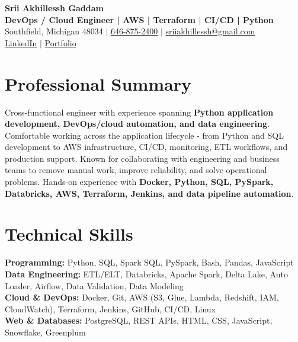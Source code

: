 \documentclass[letterpaper,10pt]{article}
\begin{document}
\fontsize{9.35pt}{10.45pt}\selectfont

\begin{center}
    {\LARGE \textbf{Srii Akhillessh Gaddam}} \\[-1pt]
    \textbf{DevOps / Cloud Engineer | AWS | Terraform | CI/CD | Python} \\[2pt]
    Southfield, Michigan 48034 $|$
    \href{tel:6468752400}{646-875-2400} $|$
    \href{mailto:sriiakhillessh@gmail.com}{sriiakhillessh@gmail.com} \\[1pt]
    \href{https://www.linkedin.com/in/srii-akhiilessh-gaddam-b48668191/}{LinkedIn} $|$
    \href{https://sriiakhillesshg.github.io/portfolio/}{Portfolio}
\end{center}
\vspace{-8pt}

\section{Professional Summary}
\small{Cross-functional engineer with experience spanning \textbf{Python application development, DevOps/cloud automation, and data engineering}. Comfortable working across the application lifecycle - from Python and SQL development to AWS infrastructure, CI/CD, monitoring, ETL workflows, and production support. Known for collaborating with engineering and business teams to remove manual work, improve reliability, and solve operational problems. Hands-on experience with \textbf{Docker, Python, SQL, PySpark, Databricks, AWS, Terraform, Jenkins, and data pipeline automation}.}

\section{Technical Skills}
\small{
\textbf{Programming:} Python, SQL, Spark SQL, PySpark, Bash, Pandas, JavaScript \\
\textbf{Data Engineering:} ETL/ELT, Databricks, Apache Spark, Delta Lake, Auto Loader, Airflow, Data Validation, Data Modeling \\
\textbf{Cloud \& DevOps:} Docker, Git, AWS (S3, Glue, Lambda, Redshift, IAM, CloudWatch), Terraform, Jenkins, GitHub, CI/CD, Linux \\
\textbf{Web \& Databases:} PostgreSQL, REST APIs, HTML, CSS, JavaScript, Snowflake, Greenplum
}
\end{document}
